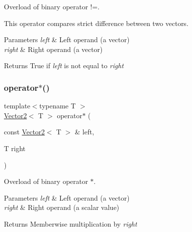Overload of binary operator !=. 

This operator compares strict difference between two vectors.


\begin{DoxyParams}{Parameters}
{\em left} & Left operand (a vector) \\
\hline
{\em right} & Right operand (a vector)\\
\hline
\end{DoxyParams}
\begin{DoxyReturn}{Returns}
True if {\itshape left} is not equal to {\itshape right} \begin{DoxyVerb}\end{DoxyVerb}
 
\end{DoxyReturn}
\mbox{\label{classsf_1_1_vector2_a5f48ca928995b41c89f155afe8d16b02}} 
\subsubsection{\texorpdfstring{operator$\ast$()}{operator*()}\hspace{0.1cm}{\footnotesize\ttfamily [1/2]}}
{\footnotesize\ttfamily template$<$typename T $>$ \\
\mbox{\hyperlink{classsf_1_1_vector2}{Vector2}}$<$ T $>$ operator$\ast$ (\begin{DoxyParamCaption}\item[{const \mbox{\hyperlink{classsf_1_1_vector2}{Vector2}}$<$ T $>$ \&}]{left,  }\item[{T}]{right }\end{DoxyParamCaption})\hspace{0.3cm}{\ttfamily [related]}}



Overload of binary operator $\ast$. 


\begin{DoxyParams}{Parameters}
{\em left} & Left operand (a vector) \\
\hline
{\em right} & Right operand (a scalar value)\\
\hline
\end{DoxyParams}
\begin{DoxyReturn}{Returns}
Memberwise multiplication by {\itshape right} \begin{DoxyVerb}\end{DoxyVerb}
 
\end{DoxyReturn}
\mbox{\label{classsf_1_1_vector2_ad8b3e1cf7b156a984bc1427539ca8605}} 
